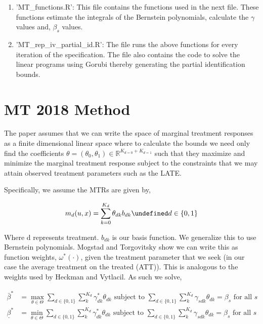 \documentclass[dvip,11pt]{article}
\newcommand{\R}{\mathbb{R}}
\let\oldforall\forall
\let\forall\undefined
\DeclareMathOperator{\forall}{\,\oldforall\,}
\DeclareMathOperator{\?}{\,?\,}
\begin{document}
\begin{enumerate}
	\item 'MT\_functions.R': This file contains the functions used in the next file. These functions estimate the integrals of the Bernstein polynomials, calculate the $\gamma$ values and, $\beta_s$ values.
	\item 'MT\_rep\_iv\_partial\_id.R': The file runs the above functions for every iteration of the specification. The file also contains the code to solve the linear programs using Gorubi thereby generating the partial identification bounds.
\end{enumerate}


\section{MT 2018 Method}

The paper assumes that we can write the space of marginal treatment responses as a finite dimensional linear space where to calculate the bounds we need only find the coefficients $\theta = (\theta_0,\theta_1)\in\R^{K_{d=0}+K_{d=1}}$ such that they maximize and minimize the marginal treatment response subject to the constraints that we may attain observed treatment parameters such as the LATE.  

Specifically, we assume the MTRs are given by,

$$m_d(u,x) = \sum^{K_d}_{k=0}\theta_{dk}b_{dk} \forall d \in \{0,1\}$$

Where d represents treatment. $b_{dk}$ is our basis function. We generalize this to use Bernstein polynomials. Mogstad and Torgovitsky show we can write this as function weights, $\omega^*(\cdot)$, given the treatment parameter that we seek (in our case the average treatment on the treated (ATT)). This is analogous to the weights used by Heckman and Vytlacil. As such we solve,


\begin{equation}\label{eq:lp}\begin{aligned}
\bar\beta^* &= \max_{\theta\in\Theta}\sum_{d\in\{0,1\}}\sum_k^{K_d}\gamma^*_{dk}\theta_{dk} \text{ subject to } \sum_{d\in\{0,1\}}\sum_k^{K_d}\gamma_{sdk}\theta_{dk} = \beta_s \text{ for all } s
\\
\underline{\beta}^* &= \min_{\theta\in\Theta}\sum_{d\in\{0,1\}}\sum_k^{K_d}\gamma^*_{dk}\theta_{dk}\text{ subject to } \sum_{d\in\{0,1\}}\sum_k^{K_d}\gamma_{sdk}\theta_{dk} = \beta_s \text{ for all } s
\end{aligned}\end{equation}
\end{document}
